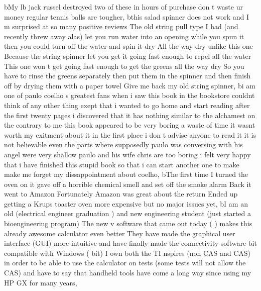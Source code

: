 \documentclass[
]{article}
\newenvironment{Shaded}{}{}
\newcommand{\NormalTok}[1]{#1}
\newcommand{\StringTok}[1]{\textcolor[rgb]{0.25,0.44,0.63}{#1}}
\begin{document}
\begin{Shaded}
\begin{Highlighting}[]
\NormalTok{       b}\StringTok{\textquotesingle{}My lb jack russel destroyed two of these in hours of purchase don t waste ur money regular tennis balls are tougher\textquotesingle{}}\NormalTok{,}
\NormalTok{       b}\StringTok{\textquotesingle{}this salad spinner does not work and I m surprised at so many positive reviews The old string pull type I had (and recently threw away alas) let you run water into an opening while you spun it then you could turn off the water and spin it dry All the way dry unlike this one Because the string spinner let you get it going fast enough to repel all the water This one won t get going fast enough to get the greens all the way dry So you have to rinse the greens separately then put them in the spinner and then finish off by drying them with a paper towel Give me back my old string spinner\textquotesingle{}}\NormalTok{,}
\NormalTok{       b}\StringTok{\textquotesingle{}i am one of paulo coelho s greatest fans when i saw this book in the bookstore couldnt think of any other thing exept that i wanted to go home and start reading after the first twenty pages i discovered that it has nothing similar to the alchamest on the contrary to me this book appeared to be very boring a waste of time it wasnt worth my exitment about it in the first place i don t advise anyone to read it it is not believable even the parts where supposedly paulo was conversing with his angel were very shallow paulo and his wife chris are too boring i felt very happy that i have finished this stupid book so that i can start another one to make make me forget my dissappointment about coelho\textquotesingle{}}\NormalTok{,}
\NormalTok{       b}\StringTok{\textquotesingle{}The first time I turned the oven on it gave off a horrible chemical smell and set off the smoke alarm Back it went to Amazon Fortunately Amazon was great about the return Ended up getting a Krups toaster oven more expensive but no major issues yet\textquotesingle{}}\NormalTok{,}
\NormalTok{       b}\StringTok{\textquotesingle{}I am an old (electrical engineer graduation ) and new engineering student (just started a bioengineering program) The new v software that came out today ( ) makes this already awesome calculator even better They have made the graphical user interface (GUI) more intuitive and have finally made the connectivity software bit compatible with Windows ( bit) I own both the TI nspires (non CAS and CAS) in order to be able to use the calculator on tests (some tests will not allow the CAS) and have to say that handheld tools have come a long way since using my HP GX for many years\textquotesingle{}}\NormalTok{,}

\end{Highlighting}
\end{Shaded}
\end{document}
